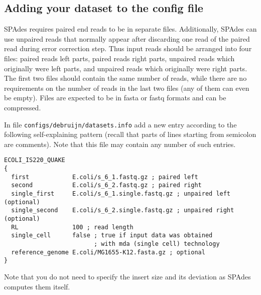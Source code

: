 \documentclass{article}
\def\spades{SPAdes}
\def\bh{BayesHammer}
\begin{document}
%

\subsection{Adding your dataset to the config file}\label{subsec:datasets}
{\spades} requires paired end reads to be in separate files.
Additionally, {\spades} can use unpaired reads that normally appear after discarding one read of the paired read during error correction step.
Thus input reads should be arranged into four files: paired reads left parts, paired reads right parts, unpaired reads which originally were left parts, and
unpaired reads which originally were right parts. The first two files should contain the same number of reads, while
there are no requirements on the number of reads in the last two files (any of them can even be empty).
Files are expected to be in fasta or fastq formats and can be compressed.

In file {\tt configs/debruijn/datasets.info} add a new entry according to the following self-explaining pattern (recall that parts of lines starting from
semicolon are comments). Note that this file may contain any number of such entries.
\begin{lstlisting}
ECOLI_IS220_QUAKE
{
  first            E.coli/s_6_1.fastq.gz ; paired left
  second           E.coli/s_6_2.fastq.gz ; paired right
  single_first     E.coli/s_6_1.single.fastq.gz ; unpaired left (optional)
  single_second    E.coli/s_6_2.single.fastq.gz ; unpaired right (optional)
  RL               100 ; read length
  single_cell      false ; true if input data was obtained 
                         ; with mda (single cell) technology
  reference_genome E.coli/MG1655-K12.fasta.gz ; optional
}
\end{lstlisting}
Note that you do not need to specify the insert size and its deviation as {\spades}
computes them itself.
\end{document}
